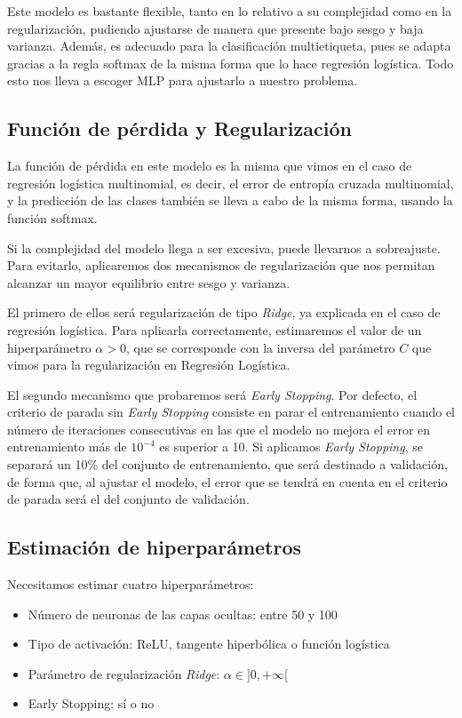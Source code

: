 \documentclass[a4]{article}
\begin{document}
Este modelo es bastante flexible, tanto en lo relativo a su complejidad como en la regularización, pudiendo ajustarse de manera que presente bajo sesgo y baja varianza. Además, es adecuado para la clasificación multietiqueta, pues se adapta gracias a la regla softmax de la misma forma que lo hace regresión logística. Todo esto nos lleva a escoger MLP para ajustarlo a nuestro problema.

\subsection{Función de pérdida y Regularización}

La función de pérdida en este modelo es la misma que vimos en el caso de regresión logística multinomial, es decir, el error de entropía cruzada multinomial, y la predicción de las clases también se lleva a cabo de la misma forma, usando la función softmax. 

Si la complejidad del modelo llega a ser excesiva, puede llevarnos a sobreajuste. Para evitarlo, aplicaremos dos mecanismos de regularización que nos permitan alcanzar un mayor equilibrio entre sesgo y varianza.

El primero de ellos será regularización de tipo \textit{Ridge}, ya explicada en el caso de regresión logística. Para aplicarla correctamente, estimaremos el valor de un hiperparámetro $\alpha>0$, que se corresponde con la inversa del parámetro $C$ que vimos para la regularización en Regresión Logística.

El segundo mecanismo que probaremos será \textit{Early Stopping}. Por defecto, el criterio de parada sin  \textit{Early Stopping} consiste en parar el entrenamiento cuando el número de iteraciones consecutivas en las que el modelo no mejora el error en entrenamiento más de $10^{-4}$ es superior a 10. Si aplicamos \textit{Early Stopping}, se separará un 10\% del conjunto de entrenamiento, que será destinado a validación, de forma que, al ajustar el modelo, el error que se tendrá en cuenta en el criterio de parada será el del conjunto de validación.


\subsection{Estimación de hiperparámetros}

Necesitamos estimar cuatro hiperparámetros:

\begin{itemize}
    \item Número de neuronas de las capas ocultas: entre 50 y 100
    \item Tipo de activación: ReLU, tangente hiperbólica o función logística
    \item Parámetro de regularización \textit{Ridge}: $\alpha \in ]0,+\infty[$
    \item Early Stopping: sí o no
\end{itemize}
\end{document}
